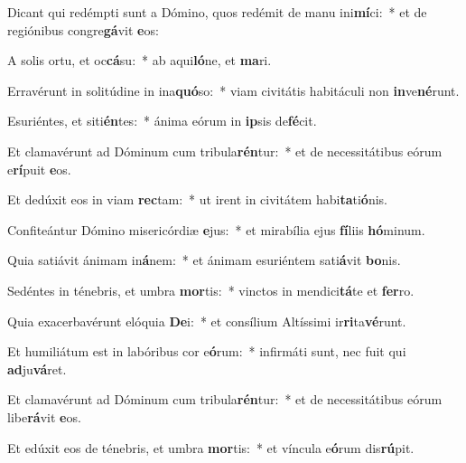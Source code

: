 \item Dicant qui redémpti sunt a Dómino, quos redémit de manu ini\textbf{mí}ci:~* et de regiónibus congre\textbf{gá}vit \textbf{e}os:
\item A solis ortu, et oc\textbf{cá}su:~* ab aqui\textbf{ló}ne, et \textbf{ma}ri.
\item Erravérunt in solitúdine in ina\textbf{quó}so:~* viam civitátis habitáculi non \textbf{in}ve\textbf{né}runt.
\item Esuriéntes, et siti\textbf{én}tes:~* ánima eórum in \textbf{ip}sis de\textbf{fé}cit.
\item Et clamavérunt ad Dóminum cum tribula\textbf{rén}tur:~* et de necessitátibus eórum e\textbf{rí}puit \textbf{e}os.
\item Et dedúxit eos in viam \textbf{rec}tam:~* ut irent in civitátem habi\textbf{ta}ti\textbf{ó}nis.
\item Confiteántur Dómino misericórdiæ \textbf{e}jus:~* et mirabília ejus \textbf{fí}liis \textbf{hó}minum.
\item Quia satiávit ánimam in\textbf{á}nem:~* et ánimam esuriéntem sati\textbf{á}vit \textbf{bo}nis.
\item Sedéntes in ténebris, et umbra \textbf{mor}tis:~* vinctos in mendici\textbf{tá}te et \textbf{fer}ro.
\item Quia exacerbavérunt elóquia \textbf{De}i:~* et consílium Altíssimi ir\textbf{ri}ta\textbf{vé}runt.
\item Et humiliátum est in labóribus cor e\textbf{ó}rum:~* infirmáti sunt, nec fuit qui \textbf{ad}ju\textbf{vá}ret.
\item Et clamavérunt ad Dóminum cum tribula\textbf{rén}tur:~* et de necessitátibus eórum libe\textbf{rá}vit \textbf{e}os.
\item Et edúxit eos de ténebris, et umbra \textbf{mor}tis:~* et víncula e\textbf{ó}rum dis\textbf{rú}pit.
